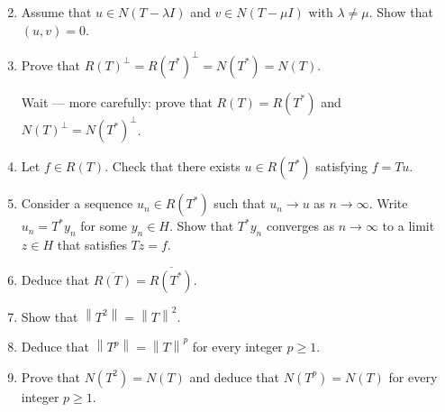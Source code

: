 \documentclass[12pt]{article}
\newcommand{\norm}[1]{\left\|#1\right\|}
\newcommand{\abs}[1]{\left|#1\right|}
\begin{document}
\begin{enumerate}
\setcounter{enumi}{1}
\item Assume that $u \in N(T - \lambda I)$ and $v \in N(T - \mu I)$ with $\lambda \neq \mu$. Show
that $(u,v) = 0$.
 
\noindent[\textit{Hint:} Prove, using question 1, that $N(T^* - \bar\mu I) = N(T - \mu I)$, and compute
$(Tu, v)$.]
 
\item Prove that $R(T)^\perp = R(T^*)^\perp = N(T^*) = N(T)$.
 
Wait — more carefully: prove that $R(T) = R(T^*)$ and $N(T)^\perp = N(T^*)^\perp$.
 
\item Let $f \in R(T)$. Check that there exists $u \in R(T^*)$ satisfying $f = Tu$.
 
\noindent[\textit{Hint:} Note that $H = R(T^*) \oplus N(T)$.]
 
\item Consider a sequence $u_n \in R(T^*)$ such that $u_n \to u$ as $n \to \infty$. Write
$u_n = T^* y_n$ for some $y_n \in H$. Show that $T^* y_n$ converges as $n \to \infty$ to a
limit $z \in H$ that satisfies $Tz = f$.
 
 
\item Deduce that $\overline{R(T)} = \overline{R(T^*)}$.
 
\noindent[\textit{Hint:} Use the fact that $N(T) = N(T^*)$.]
 
\item Show that $\norm{T^2} = \norm{T}^2$.
 
\noindent[\textit{Hint:} Write $\abs{Tu}^2 \le \abs{T^*Tu}\,\abs{u} = \abs{T^2u}\,\abs{u}$.]
 
\item Deduce that $\norm{T^p} = \norm{T}^p$ for every integer $p \ge 1$.
 
\noindent[\textit{Hint:} Consider first the case $p = 2^k$. For a general integer $p$, choose any $k$
such that $2^k \ge p$ and write $\norm{T}^{2^k} = \norm{T^{2^k}} = \norm{T^{2^k - p}T^p}$.]
 
\item Prove that $N(T^2) = N(T)$ and deduce that $N(T^p) = N(T)$ for every integer
$p \ge 1$.
 
\noindent[\textit{Hint:} Note that if $T^2 u = 0$, then $Tu \in N(T) \cap R(T^*)$.]
\end{enumerate}
 
\end{document}

